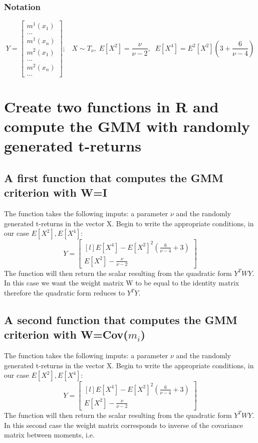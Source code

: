 \subsubsection{Notation}
\begin{equation*}
    Y=
    \begin{bmatrix}
        m^1(x_1)\\
        ...\\
        m^1(x_n)\\
        m^2(x_1)\\
        ...\\
        m^2(x_n)\\
        ...
    \end{bmatrix};\;\;\;
    X \sim T_\nu, \; E[X^2]=\frac{\nu}{\nu-2},\;\;
    E[X^4]=E^2[X^2](3+\frac{6}{\nu-4})
\end{equation*}


\newpage

\section{Create two functions in R and compute the GMM with randomly generated t-returns}

\subsection{A first function that computes the GMM criterion with W=I}
The function takes the following imputs: a parameter $\nu$ and the randomly generated t-returns in the vector X. Begin to write the appropriate conditions, in our case $E[X^2], E[X^4]$:
\begin{equation*}
    Y=    
    \begin{bmatrix}[l]
    E[X^4]-E[X^2]^2(\frac{6}{\nu-4}+3)  \\
    E[X^2]-\frac{\nu}{\nu-2}
    \end{bmatrix}
\end{equation*}
The function will then return the scalar resulting from the quadratic form $Y^TWY$. In this case we want the weight matrix W to be equal to the identity matrix therefore the quadratic form reduces to $Y^TY$.


\subsection{A second function that computes the GMM criterion with W=Cov($m_i$)}
The function takes the following imputs: a parameter $\nu$ and the randomly generated t-returns in the vector X. Begin to write the appropriate conditions, in our case $E[X^2], E[X^4]$:
\begin{equation*}
    Y=    
    \begin{bmatrix}[l]
    E[X^4]-E[X^2]^2(\frac{6}{\nu-4}+3)  \\
    E[X^2]-\frac{\nu}{\nu-2}
    \end{bmatrix}
\end{equation*}
The function will then return the scalar resulting from the quadratic form $Y^TWY$. In this second case the weight matrix corresponds to inverse of the covariance matrix between moments, i.e.

